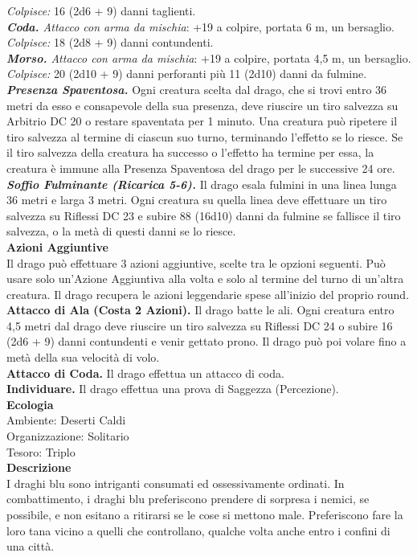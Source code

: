 \begin{multicols}{2}
\emph{Colpisce:} 16 (2d6 + 9) danni taglienti.\\
\emph{\textbf{Coda.} Attacco con arma da mischia}: +19 a colpire, portata 6 m, un bersaglio.\\
\emph{Colpisce:} 18 (2d8 + 9) danni contundenti.\\
\emph{\textbf{Morso.} Attacco con arma da mischia}: +19 a colpire, portata 4,5 m, un bersaglio.\\
\emph{Colpisce:} 20 (2d10 + 9) danni perforanti più 11 (2d10) danni da fulmine.\\
\emph{\textbf{Presenza Spaventosa.}} Ogni creatura scelta dal drago, che si trovi entro 36 metri da esso e consapevole della sua presenza, deve riuscire un tiro salvezza su Arbitrio DC 20 o restare spaventata per 1 minuto. Una creatura può ripetere il tiro salvezza al termine di ciascun suo turno, terminando l'effetto se lo riesce. Se il tiro salvezza della creatura ha successo o l'effetto ha termine per essa, la creatura è immune alla Presenza Spaventosa del drago per le successive 24 ore.\\
\emph{\textbf{Soffio Fulminante (Ricarica 5-6).}} Il drago esala fulmini in una linea lunga 36 metri e larga 3 metri. Ogni creatura su quella linea deve effettuare un tiro salvezza su Riflessi DC 23 e subire 88 (16d10) danni da fulmine se fallisce il tiro salvezza, o la metà di questi danni se lo riesce.\\
\textbf{Azioni Aggiuntive}\\
Il drago può effettuare 3 azioni aggiuntive, scelte tra le opzioni seguenti. Può usare solo un'Azione Aggiuntiva alla volta e solo al termine del turno di un'altra creatura. Il drago recupera le azioni leggendarie spese all'inizio del proprio round.\\
\textbf{Attacco di Ala (Costa 2 Azioni).} Il drago batte le ali. Ogni creatura entro 4,5 metri dal drago deve riuscire un tiro salvezza su Riflessi DC 24 o subire 16 (2d6 + 9) danni contundenti e venir gettato prono. Il drago può poi volare fino a metà della sua velocità di volo.\\
\textbf{Attacco di Coda.} Il drago effettua un attacco di coda.\\
\textbf{Individuare.} Il drago effettua una prova di Saggezza (Percezione).\\
\textbf{Ecologia}\\
Ambiente: Deserti Caldi\\
Organizzazione: Solitario\\
Tesoro: Triplo\\
\textbf{Descrizione}\\
I draghi blu sono intriganti consumati ed ossessivamente ordinati. In combattimento, i draghi blu preferiscono prendere di sorpresa i nemici, se possibile, e non esitano a ritirarsi se le cose si mettono male. Preferiscono fare la loro tana vicino a quelli che controllano, qualche volta anche entro i confini di una città.\\


\end{multicols}
